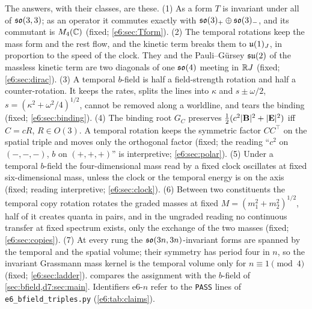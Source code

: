 The answers, with their classes, are these. (1) As a form $T$ is invariant under all of $\mathfrak{so}(3,3)$; as an operator it commutes exactly with
$\mathfrak{so}(3)_+\oplus\mathfrak{so}(3)_-$, and its commutant is $M_4(\mathbb{C})$ (fixed; \cref{e6:sec:Tform}). (2) The temporal rotations keep the mass form and the rest
flow, and the kinetic term breaks them to $\mathfrak{u}(1)_J$, in proportion to the speed of the clock. They and the Pauli--G\"ursey $\mathfrak{su}(2)$ of the massless
kinetic term are two diagonals of one $\mathfrak{so}(4)$ meeting in $\mathbb{R} J$ (fixed; \cref{e6:sec:dirac}). (3) A temporal $b$-field is half a field-strength
rotation and half a counter-rotation. It keeps the rates, splits the lines into $\kappa$ and $s\pm\omega/2$, $s=(\kappa^2+\omega^2/4)^{1/2}$, cannot be
removed along a worldline, and tears the binding (fixed; \cref{e6:sec:binding}). (4) The binding root $G_C$ preserves
$\tfrac12(c^2|\mathbf B|^2+|\mathbf E|^2)$ iff $C=cR$, $R\in O(3)$. A temporal rotation keeps the symmetric factor $CC^{\!\top}$ on the spatial triple and moves
only the orthogonal factor (fixed; the reading ``$c^2$ on $(-,-,-)$, $b$ on $(+,+,+)$'' is interpretive; \cref{e6:sec:polar}). (5) Under a temporal
$b$-field the four-dimensional mass read by a fixed clock oscillates at fixed six-dimensional mass, unless the clock or the temporal energy is on
the axis (fixed; reading interpretive; \cref{e6:sec:clock}). (6) Between two constituents the temporal copy rotation rotates the graded masses at
fixed $M=(m_1^2+m_2^2)^{1/2}$, half of it creates quanta in pairs, and in the ungraded reading no continuous transfer at fixed spectrum exists,
only the exchange of the two masses (fixed;
\cref{e6:sec:copies}). (7) At every rung the $\mathfrak{so}(3n,3n)$-invariant forms are spanned by the temporal and the spatial volume; their symmetry has
period four in $n$, so the invariant Grassmann mass kernel is the temporal volume only for $n\equiv1\pmod4$ (fixed; \cref{e6:sec:ladder}).
 compares the assignment with the $b$-field of \cref{sec:bfield,d7:sec:main}. Identifiers e6-$n$ refer to the \texttt{PASS} lines of
\texttt{e6\_bfield\_triples.py} (\cref{e6:tab:claims}).

